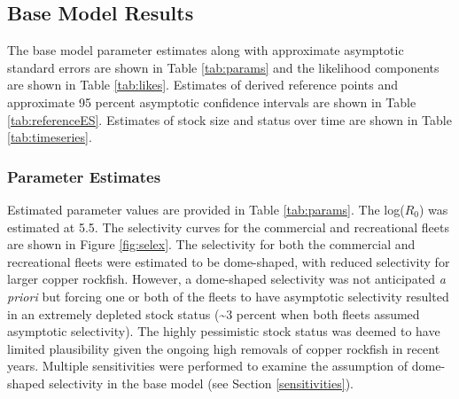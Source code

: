 \documentclass[11pt,
  english,
  a4paper,
]{article}
\begin{document}

\hypertarget{base-model-results}{%
\subsection{Base Model Results}\label{base-model-results}}

\leavevmode\tagmcend\tagstructend


The base model parameter estimates along with approximate asymptotic standard errors are shown in Table \ref{tab:params} and the likelihood components are shown in Table \ref{tab:likes}. Estimates of derived reference points and approximate 95 percent asymptotic confidence intervals are shown in Table \ref{tab:referenceES}. Estimates of stock size and status over time are shown in Table \ref{tab:timeseries}.

\leavevmode\tagmcend\tagstructend\par


\hypertarget{parameter-estimates}{%
\subsubsection{Parameter Estimates}\label{parameter-estimates}}

\leavevmode\tagmcend\tagstructend


Estimated parameter values are provided in Table \ref{tab:params}. The log({\(R_0\)\leavevmode\tagmcend\tagstructend}) was estimated at 5.5. The selectivity curves for the commercial and recreational fleets are shown in Figure \ref{fig:selex}. The selectivity for both the commercial and recreational fleets were estimated to be dome-shaped, with reduced selectivity for larger copper rockfish. However, a dome-shaped selectivity was not anticipated \emph{a priori} but forcing one or both of the fleets to have asymptotic selectivity resulted in an extremely depleted stock status (\textasciitilde3 percent when both fleets assumed asymptotic selectivity). The highly pessimistic stock status was deemed to have limited plausibility given the ongoing high removals of copper rockfish in recent years. Multiple sensitivities were performed to examine the assumption of dome-shaped selectivity in the base model (see Section \ref{sensitivities}).
\end{document}
